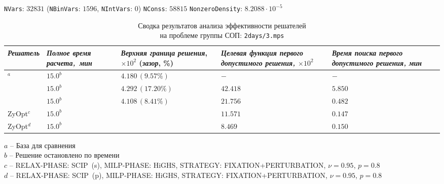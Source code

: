 \documentclass[%
	11pt,
	a4paper,
	utf8,
		]{article}
\begin{document}
\newpage

{
	\begin{table}[!h]
		\centering
		\caption{Сводка результатов анализа эффективности решателей\\ на проблеме группы СОП: \texttt{2days/3.mps}} 
		
		{\footnotesize \texttt{NVars}: $ 32 831 $ (\texttt{NBinVars}: $ 1596 $,  \texttt{NIntVars}: $ 0 $) \texttt{NConss}: $ 58 815 $ \texttt{NonzeroDensity}: $ 8.2088 \cdot 10^{-5} $}\\[2mm]
		
		\begin{tabular}{ p{2.9cm} | p{2.5cm} p{3.6cm} p{3.75cm} p{3.6cm} p{3.2cm} }
			\rowcolor{black!5}\emph{Решатель} & \emph{Полное время \mbox{расчета, мин}} & \emph{Верхняя граница} \mbox{\itshape решения}, $ \times 10^{2} $ (\emph{зазор}, \%) & \emph{Целевая функция первого допустимого решения, $ \times 10^2 $} & \emph{Время поиска первого допустимого решения, мин} \\
			\hline
			\rowcolor{blue!3}{CPLEX 12.8.0.0}$ ^a $ & $ 15.0^b $ & $ 4.180 \, (9.57\%) $ & $ - $ & $ - $ \\
			\rowcolor{black!5}{SCIP 8.0.3} & $ 15.0^b $ & $ 4.292 \, (17.20\%) $ & $ 42.418 $ & $ 5.850 $ \\
			\rowcolor{blue!3}{HiGHS 1.5.3} & $ 15.0^b $ & $ 4.108 \, (8.41\%) $ & $ 21.756 $ & $ 0.482 $ \\
			\rowcolor{black!5}ZyOpt$^c $ & {$ 15.0^b $}  & \ccb{$ 4.446 \, (18.59\%) (-6.4\%) $} & $ 11.571 $ & $ 0.147 $ \\
			\rowcolor{blue!3}ZyOpt$^d $ & {$ 15.0^b $}  & \ccg{$ 4.122 \, (11.24\%) (+1.4\%) $} & $ 8.469 $ & $ 0.150 $ 
		\end{tabular}
	\end{table}
	\vspace*{-3mm}
	\hspace*{3mm}$ a $ -- {\footnotesize База для сравнения}\\[-7mm]
	
	\hspace*{3mm}$ b $ -- {\footnotesize Решение остановлено по времени}\\[-7mm]
	
	\hspace*{3mm}$ c $ -- {\footnotesize RELAX-PHASE: SCIP~(s), MILP-PHASE: HiGHS, STRATEGY: FIXATION+PERTURBATION, $ \nu = 0.95 $, $ p = 0.8 $}\\[-7mm]
	
	\hspace*{3mm}$ d $ -- {\footnotesize RELAX-PHASE: SCIP~(p), MILP-PHASE: HiGHS, STRATEGY: FIXATION+PERTURBATION, $ \nu = 0.95 $, $ p = 0.8 $}\\[-7mm]
}
\end{document}

